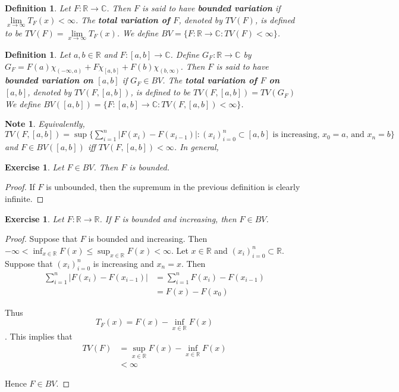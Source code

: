 \documentclass[12pt]{amsart}
\newtheorem{defn}[thm]{Definition}
\newtheorem{note}[thm]{Note}
\newtheorem{ex}[thm]{Exercise}
\newcommand{\C}{\mathbb{C}}
\newcommand{\R}{\mathbb{R}}
\begin{document}
\begin{defn}
Let $F:\R \rightarrow \C$. Then $F$ is said to have \textbf{bounded variation} if $\lim \limits_{x \rightarrow \infty}T_F(x)<\infty$. The \textbf{total variation of $F$}, denoted by $TV(F)$, is defined to be $TV(F) = \lim\limits_{x\rightarrow \infty}T_F(x)$.
We define $BV = \{F:\R \rightarrow \C: TV(F)<\infty \}$.
\end{defn}

\begin{defn}
Let $a,b \in \R$ and $F:[a,b] \rightarrow \C$. Define $G_F:\R \rightarrow \C$ by $G_F = F(a)\chi_{(-\infty,a)} + F\chi_{[a,b]}+F(b)\chi_{(b,\infty)}$. Then $F$ is said to have \textbf{bounded variation on $[a,b]$} if $G_F \in BV$. The \textbf{total variation of $F$ on $[a,b]$}, denoted by $TV(F, [a,b])$, is defined to be $TV(F, [a,b]) = TV(G_F)$ We define $BV([a,b]) = \{F:[a,b] \rightarrow \C: TV(F, [a,b]) < \infty\}$.
\end{defn}

\begin{note}
Equivalently, $TV(F, [a,b]) = \sup \big \{\sum_{i=1}^{n}|F(x_{i}) - F(x_{i-1})|: (x_i)_{i=0}^n \subset [a,b] \text{ is increasing, } x_0=a \text{, and } x_n=b\big \}$ and $F \in BV([a,b])$ iff $TV(F, [a,b]) < \infty$. In general, 
\end{note}

\begin{ex}
Let $F \in BV$. Then $F$ is bounded.
\end{ex}

\begin{proof}
If $F$ is unbounded, then the supremum in the previous definition is clearly infinite.
\end{proof}

\begin{ex}
Let $F:\R \rightarrow \R$. If $F$ is bounded and increasing, then $F \in BV$.
\end{ex}

\begin{proof}
Suppose that $F$ is bounded and increasing. Then $-\infty<\inf_{x \in \R}F(x) \leq \sup_{x \in \R}F(x)<\infty$. Let $x \in \R$ and $(x_i)_{i=0}^n \subset \R$. Suppose that $(x_i)_{i=0}^n$ is increasing and $x_n=x$. Then 
\begin{align*}
\sum_{i=1}^n|F(x_i)-F(x_{i-1})| 
&= \sum_{i=1}^n F(x_i)-F(x_{i-1})\\
&= F(x)-F(x_0)
\end{align*}

Thus $$T_F(x) = F(x)-\inf_{x \in \R}F(x)$$. This implies that 
\begin{align*}
TV(F) 
&= \sup_{x \in \R}F(x)-\inf_{x \in \R}F(x)\\
&<\infty
\end{align*}

Hence $F \in BV$.
\end{proof}
\end{document}
